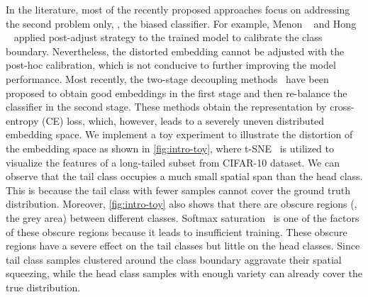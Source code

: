 \documentclass[10pt,twocolumn,letterpaper]{article}
\begin{document}
In the literature, most of the recently proposed approaches focus on addressing the second problem only, \ie, the biased classifier. For example,  Menon \etal~\cite{adjustment21} and Hong \etal~\cite{Hong2021CVPR} applied post-adjust strategy to the trained model to calibrate the class boundary. Nevertheless, the distorted embedding cannot be adjusted with the post-hoc calibration, which is not conducive to further improving the model performance. Most recently, the two-stage decoupling methods~\cite{bbn20, decouple20, Kaidi2019, wang2020devil, DisAli21} have been proposed to obtain good embeddings in the first stage and then re-balance the classifier in the second stage. These methods obtain the representation by cross-entropy (CE) loss, which, however, leads to a severely uneven distributed embedding space. We implement a toy experiment to illustrate the distortion of the embedding space as shown in \cref{fig:intro-toy}, where t-SNE~\cite{van2008visualizing} is utilized to visualize the features of a long-tailed subset from CIFAR-10 dataset. We can observe that the tail class occupies a much small spatial span than the head class. This is because the tail class with fewer samples cannot cover the ground truth distribution. Moreover, \cref{fig:intro-toy} also shows that there are obscure regions (\ie, the grey area) between different classes. Softmax saturation~\cite{Chen2017CVPR} is one of the factors of these obscure regions because it leads to insufficient training. These obscure regions have a severe effect on the tail classes but little on the head classes. Since tail class samples clustered around the class boundary aggravate their spatial squeezing, while the head class samples with enough variety can already cover the true distribution.
\end{document}
